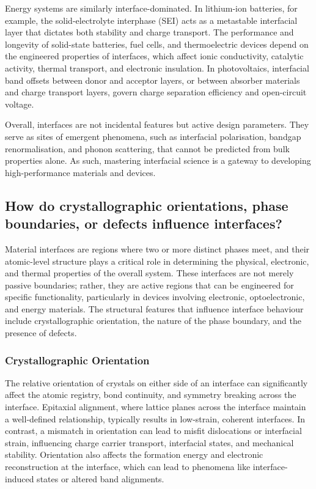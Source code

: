 Energy systems are similarly interface-dominated. In lithium-ion batteries, for example, the solid-electrolyte interphase (SEI) acts as a metastable interfacial layer that dictates both stability and charge transport. The performance and longevity of solid-state batteries, fuel cells, and thermoelectric devices depend on the engineered properties of interfaces, which affect ionic conductivity, catalytic activity, thermal transport, and electronic insulation. In photovoltaics, interfacial band offsets between donor and acceptor layers, or between absorber materials and charge transport layers, govern charge separation efficiency and open-circuit voltage.

Overall, interfaces are not incidental features but active design parameters. They serve as sites of emergent phenomena, such as interfacial polarisation, bandgap renormalisation, and phonon scattering, that cannot be predicted from bulk properties alone. As such, mastering interfacial science is a gateway to developing high-performance materials and devices.

\subsection{How do crystallographic orientations, phase boundaries, or defects influence interfaces?}

Material interfaces are regions where two or more distinct phases meet, and their atomic-level structure plays a critical role in determining the physical, electronic, and thermal properties of the overall system. These interfaces are not merely passive boundaries; rather, they are active regions that can be engineered for specific functionality, particularly in devices involving electronic, optoelectronic, and energy materials. The structural features that influence interface behaviour include crystallographic orientation, the nature of the phase boundary, and the presence of defects.

\subsubsection{Crystallographic Orientation}

The relative orientation of crystals on either side of an interface can significantly affect the atomic registry, bond continuity, and symmetry breaking across the interface. Epitaxial alignment, where lattice planes across the interface maintain a well-defined relationship, typically results in low-strain, coherent interfaces. In contrast, a mismatch in orientation can lead to misfit dislocations or interfacial strain, influencing charge carrier transport, interfacial states, and mechanical stability. Orientation also affects the formation energy and electronic reconstruction at the interface, which can lead to phenomena like interface-induced states or altered band alignments.

